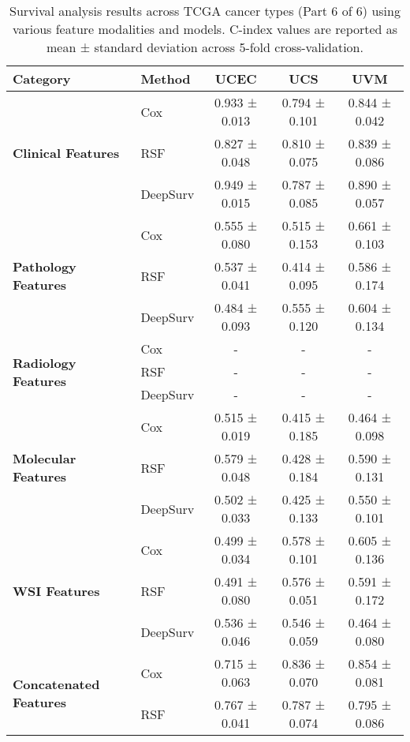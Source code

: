 \begin{sidewaystable}[htbp]
    \centering
    \caption{Survival analysis results across TCGA cancer types (Part 6 of 6) using various feature modalities and models. C-index values are reported as mean ± standard deviation across 5-fold cross-validation.}
    \label{tab:survival_results_6}
    \begin{tabular}{@{}llccc@{}}
        \toprule
        \textbf{Category} & \textbf{Method} & \textbf{UCEC} & \textbf{UCS} & \textbf{UVM} \\
        \midrule
        \multirow{3}{*}{\textbf{Clinical Features}} & Cox & 0.933 ± 0.013 & 0.794 ± 0.101 & 0.844 ± 0.042 \\
        & RSF & 0.827 ± 0.048 & 0.810 ± 0.075 & 0.839 ± 0.086 \\
        & DeepSurv & 0.949 ± 0.015 & 0.787 ± 0.085 & 0.890 ± 0.057 \\
        \midrule
        \multirow{3}{*}{\textbf{Pathology Features}} & Cox & 0.555 ± 0.080 & 0.515 ± 0.153 & 0.661 ± 0.103 \\
        & RSF & 0.537 ± 0.041 & 0.414 ± 0.095 & 0.586 ± 0.174 \\
        & DeepSurv & 0.484 ± 0.093 & 0.555 ± 0.120 & 0.604 ± 0.134 \\
        \midrule
        \multirow{3}{*}{\textbf{Radiology Features}} & Cox & - & - & - \\
        & RSF & - & - & - \\
        & DeepSurv & - & - & - \\
        \midrule
        \multirow{3}{*}{\textbf{Molecular Features}} & Cox & 0.515 ± 0.019 & 0.415 ± 0.185 & 0.464 ± 0.098 \\
        & RSF & 0.579 ± 0.048 & 0.428 ± 0.184 & 0.590 ± 0.131 \\
        & DeepSurv & 0.502 ± 0.033 & 0.425 ± 0.133 & 0.550 ± 0.101 \\
        \midrule
        \multirow{3}{*}{\textbf{WSI Features}} & Cox & 0.499 ± 0.034 & 0.578 ± 0.101 & 0.605 ± 0.136 \\
        & RSF & 0.491 ± 0.080 & 0.576 ± 0.051 & 0.591 ± 0.172 \\
        & DeepSurv & 0.536 ± 0.046 & 0.546 ± 0.059 & 0.464 ± 0.080 \\
        \midrule
        \multirow{3}{*}{\textbf{Concatenated Features}} & Cox & 0.715 ± 0.063 & 0.836 ± 0.070 & 0.854 ± 0.081 \\
        & RSF & 0.767 ± 0.041 & 0.787 ± 0.074 & 0.795 ± 0.086 \\

\end{tabular}
\end{sidewaystable}
